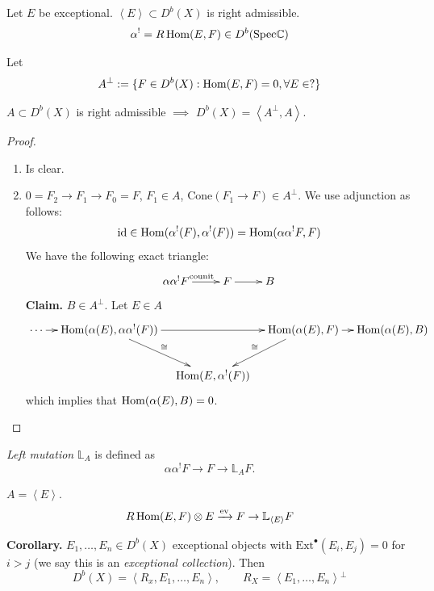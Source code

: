 \begin{exercise}
\label{exercise-right-admissible}
Let $E$ be exceptional.
$\left\langle{}E\right\rangle{}\subset D^b(X)$ is right
admissible.
$$
\alpha^!=R \mathop{\mathrm{Hom}}\nolimits(E,F) \in D^b(\text{Spec}
\mathbb{C})
$$
\end{exercise}

Let
$$
A^\perp:=\{F \in D^b(X):\mathop{\mathrm{Hom}}\nolimits(E,F)=0, \forall
E \in ?\}
$$
\begin{lemma}
\label{lemma-right-admissible}
$A \subset D^b(X)$ is right admissible
$\implies$ $D^b(X)=\left\langle{}A^\perp,A\right\rangle{}$.
\end{lemma}

\begin{proof}
\begin{enumerate}
\item Is clear.
\item $0=F_2 \to F_1 \to F_0=F$, $F_1 \in A$,
$\text{Cone}(F_1 \to F) \in
A^\perp$. We use adjunction as follows:
$$
\text{id} \in
\mathop{\mathrm{Hom}}\nolimits(\alpha^!(F),\alpha^!(F))=\mathop{\mathrm{Hom}}\nolimits(\alpha
\alpha^!F,F)
$$
We have the following exact triangle:
$$
\xymatrix{
\alpha \alpha^!F\ar[r]^{\text{counit}}&
F\ar[r]& B
}
$$
{\bf Claim.} $B \in A^\perp$. Let $E \in A$
$$
\xymatrix@C=1em{
\cdots\ar[r]&\Hom(\alpha(E),\alpha
\alpha^!(F))\ar[dr]^{\cong}\ar[rr]&&
\Hom(\alpha(E),F)\ar[dl]_{\cong}\ar[r]&
\Hom(\alpha(E),B)\\
& & \Hom(E,\alpha^!(F))
}
$$
which implies that $\mathop{\mathrm{Hom}}\nolimits(\alpha(E),B)=0$.

\end{enumerate}
\end{proof}

\begin{definition}
\label{definition-left-mutation}
{\it Left mutation} $\mathbb{L}_A$ is defined
as
$$
\alpha \alpha^!F \to F \to \mathbb{L}_AF.
$$
\end{definition}

\begin{exercise}
\label{exercise-left-mutation}
$A=\left\langle{}E\right\rangle{}$.
$$
R \mathop{\mathrm{Hom}}\nolimits(E,F)\otimes E \xrightarrow{\text{ev}}F
\to \mathbb{L}_{\left\langle{}E\right\rangle{}}F
$$
\end{exercise}

{\bf Corollary.} $E_1,\ldots,E_n \in D^b(X)$
exceptional objects with
$\text{Ext}^\bullet(E_i,E_j)=0$ for $i>j$ (we
say this is an  {\it exceptional
collection}). Then
$$
D^b(X)=\left\langle{}R_x,E_1,\ldots,E_n\right\rangle{},\qquad
R_X=\left\langle{}E_1,\ldots,E_n\right\rangle{}^\perp
$$

